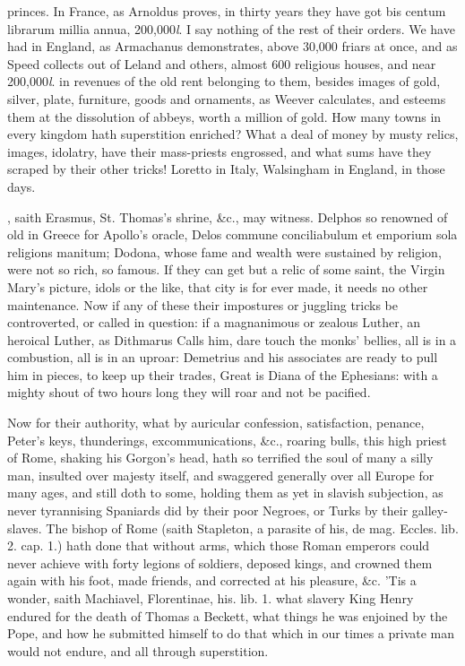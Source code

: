 {princes. In France, as Arnoldus proves, in thirty years they have got
bis centum librarum millia annua, 200,000\emph{l}. I say nothing of the rest
of their orders. We have had in England, as Armachanus demonstrates,
above 30,000 friars at once, and as Speed collects out of Leland
and others, almost 600 religious houses, and near 200,000\emph{l}. in
revenues of the old rent belonging to them, besides images of gold,
silver, plate, furniture, goods and ornaments, as Weever
calculates, and esteems them at the dissolution of abbeys, worth a
million of gold. How many towns in every kingdom hath superstition
enriched? What a deal of money by musty relics, images, idolatry, have
their mass-priests engrossed, and what sums have they scraped by their
other tricks! Loretto in Italy, Walsingham in England, in those days.

, saith
Erasmus, St. Thomas's shrine, \&c., may witness. Delphos so
renowned of old in Greece for Apollo's oracle, Delos commune
conciliabulum et emporium sola religions manitum; Dodona, whose fame
and wealth were sustained by religion, were not so rich, so famous. If
they can get but a relic of some saint, the Virgin Mary's picture,
idols or the like, that city is for ever made, it needs no other
maintenance. Now if any of these their impostures or juggling tricks be
controverted, or called in question: if a magnanimous or zealous
Luther, an heroical Luther, as Dithmarus Calls him, dare touch
the monks' bellies, all is in a combustion, all is in an uproar:
Demetrius and his associates are ready to pull him in pieces, to keep
up their trades,  Great is Diana of the Ephesians: with a mighty
shout of two hours long they will roar and not be pacified.

Now for their authority, what by auricular confession, satisfaction,
penance, Peter's keys, thunderings, excommunications, \&c., roaring
bulls, this high priest of Rome, shaking his Gorgon's head, hath so
terrified the soul of many a silly man, insulted over majesty itself,
and swaggered generally over all Europe for many ages, and still doth
to some, holding them as yet in slavish subjection, as never
tyrannising Spaniards did by their poor Negroes, or Turks by their
galley-slaves. The bishop of Rome (saith Stapleton, a parasite of
his, de mag. Eccles. lib. 2. cap. 1.) hath done that without arms,
which those Roman emperors could never achieve with forty legions of
soldiers, deposed kings, and crowned them again with his foot, made
friends, and corrected at his pleasure, \&c.  'Tis a wonder, saith
Machiavel, Florentinae, his. lib. 1. what slavery King Henry 
endured for the death of Thomas a Beckett, what things he was enjoined
by the Pope, and how he submitted himself to do that which in our times
a private man would not endure, and all through superstition.

}

